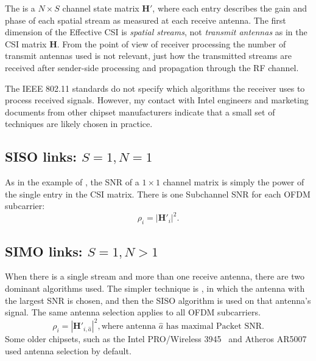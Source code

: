 The  is a $N\times S$ channel state matrix $\mathbf{H}'$, where each entry describes the gain and phase of each spatial stream as measured at each receive antenna. The first dimension of the Effective CSI is \emph{spatial streams}, not \emph{transmit antennas} as in the CSI matrix $\mathbf{H}$. From the point of view of receiver processing the number of transmit antennas used is not relevant, just how the transmitted streams are received after sender-side processing and propagation through the RF channel.

The IEEE 802.11 standards do not specify which algorithms the receiver uses to process received signals. However, my contact with Intel engineers and marketing documents from other chipset manufacturers indicate that a small set of techniques are likely chosen in practice.

\subsection{SISO links: $S=1,N=1$}
As in the example of , the SNR of a $1\times1$ channel matrix is simply the power of the single entry in the CSI matrix. There is one Subchannel SNR for each OFDM subcarrier:
\begin{equation}
	\rho_i = \left| \mathbf{H}'_i \right|^2.
\end{equation}

\subsection{SIMO links: $S=1,N>1$}
When there is a single stream and more than one receive antenna, there are two dominant algorithms used. The simpler technique is , in which the antenna with the largest SNR is chosen, and then the SISO algorithm is used on that antenna's signal. The same antenna selection applies to all OFDM subcarriers.
\begin{equation}
	\rho_i = \left| \mathbf{H}'_{i,\hat{a}} \right|^2, \text{where antenna } \hat{a} \text{ has maximal Packet SNR}.
\end{equation}
Some older chipsets, such as the Intel PRO/Wireless 3945~\cite[\S3.5]{ipw3945} and Atheros AR5007~\cite{madwifi_diversity} used antenna selection by default.

